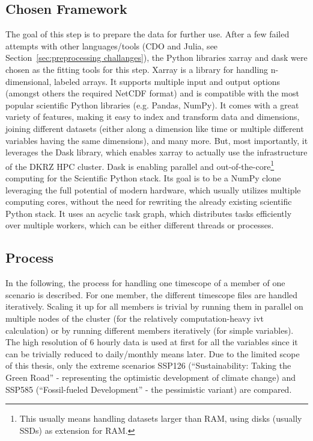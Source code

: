 \subsection{Chosen Framework}
\label{sec:preprocessing_framework}

The goal of this step is to prepare the data for further use. 
After a few failed attempts with other languages/tools (CDO and Julia, see Section~\ref{sec:preprocessing challanges}), the Python libraries xarray \cite{hoyer_xarray_2017} and dask \cite{rocklin2015dask} were chosen as the fitting tools for this step.
Xarray is a library for handling n-dimensional, labeled arrays. It supports multiple input and output options (amongst others the required NetCDF format) and is compatible with the most popular scientific Python libraries (e.g. Pandas, NumPy). 
It comes with a great variety of features, making it easy to index and transform data and dimensions, joining different datasets (either along a dimension like time or multiple different variables having the same dimensions), and many more. 
But, most importantly, it leverages the Dask library, which enables xarray to actually use the infrastructure of the DKRZ HPC cluster. 
Dask is enabling parallel and out-of-the-core\footnote{This usually means handling datasets larger than RAM, using disks (usually SSDs) as extension for RAM.} computing for the Scientific Python stack. 
Its goal is to be a NumPy clone leveraging the full potential of modern hardware, which usually utilizes multiple computing cores, without the need for rewriting the already existing scientific Python stack. 
It uses an acyclic task graph, which distributes tasks efficiently over multiple workers, which can be either different threads or processes. \cite{rocklin2015dask}


\subsection{Process}
\label{sec:preprocessing process}

In the following, the process for handling one timescope of a member of one scenario is described. For one member, the different timescope files are handled iteratively. 
Scaling it up for all members is trivial by running them in parallel on multiple nodes of the cluster (for the relatively computation-heavy \ac{ivt} calculation) or by running different members iteratively (for simple variables). 
The high resolution of 6 hourly data is used at first for all the variables since it can be trivially reduced to daily/monthly means later. 
Due to the limited scope of this thesis, only the extreme scenarios SSP126 (\enquote{Sustainability: Taking the Green Road} - representing the optimistic development of climate change) and SSP585 (\enquote{Fossil-fueled Development} - the pessimistic variant) are compared. 


